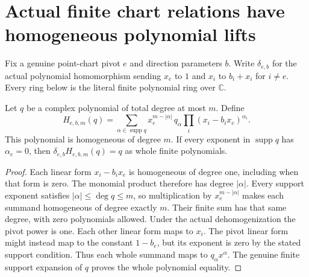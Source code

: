 \section{Actual finite chart relations have homogeneous polynomial lifts}

Fix a genuine point-chart pivot $e$ and direction parameters $b$.
Write $\delta_{e,b}$ for the actual polynomial homomorphism sending
$x_e$ to $1$ and $x_i$ to $b_i+x_i$ for $i\ne e$. Every ring below
is the literal finite polynomial ring over $\mathbb C$.

\begin{lemma}
\label{hir:actual-polynomial-rehomogenization}
\leanok
Let $q$ be a complex polynomial of total degree at most $m$. Define
\[
 H_{e,b,m}(q)=\sum_{\alpha\in\operatorname{supp}q}
 x_e^{m-|\alpha|}\,q_\alpha
 \prod_i(x_i-b_i x_e)^{\alpha_i}.
\]
This polynomial is homogeneous of degree $m$. If every exponent in
$\operatorname{supp}q$ has $\alpha_e=0$, then
$\delta_{e,b}H_{e,b,m}(q)=q$ as whole finite polynomials.
\end{lemma}
\begin{proof}
Each linear form $x_i-b_i x_e$ is homogeneous of degree one, including
when that form is zero. The monomial product therefore has degree
$|\alpha|$. Every support exponent satisfies $|\alpha|\le\deg q\le m$,
so multiplication by $x_e^{m-|\alpha|}$ makes each summand homogeneous
of degree exactly $m$. Their finite sum has that same degree, with zero
polynomials allowed. Under the actual dehomogenization the pivot power
is one. Each other linear form maps to $x_i$. The pivot linear form
might instead map to the constant $1-b_e$, but its exponent is zero
by the stated support condition. Thus each whole summand maps to
$q_\alpha x^\alpha$. The genuine finite support expansion of $q$
proves the whole polynomial equality.
\end{proof}

